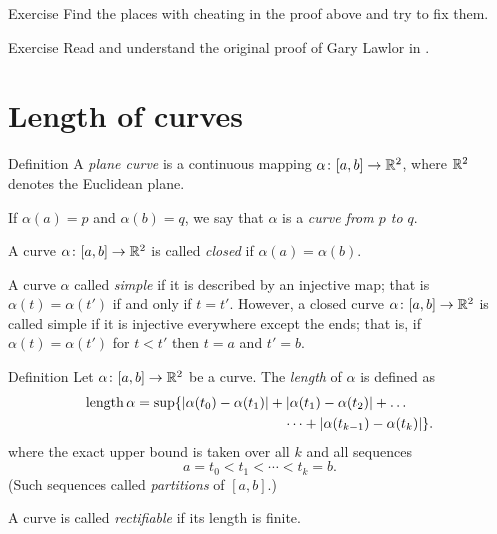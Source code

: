 \begin{thm}{Exercise}
Find the places with cheating in the proof above and try to fix them.
\end{thm}

\begin{thm}{Exercise} Read and understand the original proof of Gary Lawlor in \cite{lawlor}.
\end{thm}



\section{Length of curves}

\begin{thm}{Definition}\label{def:curve}
A \emph{plane curve} is a continuous mapping $\alpha\:[a,b]\z\to \RR^2$,
where $\mathbb{R}^2$ denotes the Euclidean plane. 

If $\alpha(a)=p$ and $\alpha(b)=q$,
we say that $\alpha$ is a \emph{curve from $p$ to $q$}.

A curve $\alpha\colon[a,b]\to \mathbb{R}^2$ is called \emph{closed} if $\alpha(a)=\alpha(b)$.

A curve $\alpha$ called \emph{simple} if it is described by an injective map;
that is $\alpha(t)=\alpha(t')$ if and only if $t=t'$.
However, a closed curve $\alpha\colon[a,b]\to \mathbb{R}^2$ is called simple if it is injective 
everywhere except the ends; that is, if
$\alpha(t)=\alpha(t')$ for $t<t'$ then $t=a$ and $t'=b$.
\end{thm}
 


\begin{thm}{Definition}\label{def:length}
Let $\alpha\colon[a,b]\to \mathbb{R}^2$ be a curve.
The \emph{length} of $\alpha$ is defined as
\begin{align*}
\length \alpha
&= 
\sup \{|\alpha(t_0)-\alpha(t_1)|+|\alpha(t_1)-\alpha(t_2)|+\dots
\\
&\ \ \ \ \ \ \ \ \ \ \ \ \ \ \ \ \ \ \ \ \ \ \ \ \ \ \ \ \ \ \ \ \dots+|\alpha(t_{k-1})-\alpha(t_k)|\}. 
\end{align*}
where the exact upper bound is taken over all $k$ and all sequences
\[a=t_0 < t_1 < \cdots < t_k=b.\]
(Such sequences called \emph{partitions} of $[a,b]$.)

A curve is called \emph{rectifiable} if its length is finite.
\end{thm}


